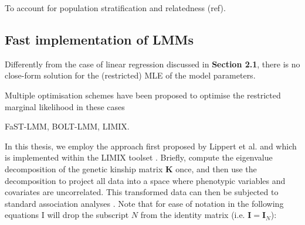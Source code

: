 To account for population stratification and relatedness (ref).




\subsection{Fast implementation of LMMs}

Differently from the case of linear regression discussed in \textbf{Section 2.1}, there is no close-form solution for the (restricted) MLE of the model parameters. 


Multiple optimisation schemes have been proposed to optimise the restricted marginal likelihood in these cases


FaST-LMM, BOLT-LMM, LIMIX.



In this thesis, we employ the approach first proposed by Lippert et al. \cite{lippert2014limix} and which is implemented within the LIMIX toolset \cite{lippert2014limix,casale2015efficient}. 
Briefly, \cite{lippert2014limix} compute the eigenvalue decomposition of the genetic kinship matrix $\mathbf{K}$ once, and then use the decomposition to project all data into a space where phenotypic variables and covariates are uncorrelated. 
This transformed data can then be subjected to standard association analyses \cite{lippert2014limix}.
Note that for ease of notation in the following equations I will drop the subscript $N$ from the identity matrix (i.e. $\mathbf{I} = \mathbf{I}_N$):

